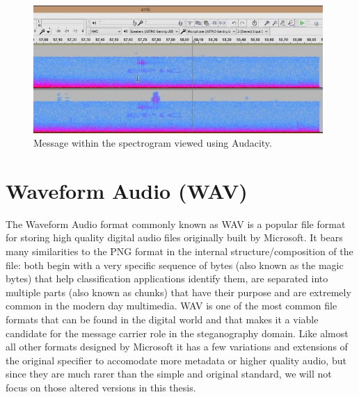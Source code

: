 \begin{figure}[H]
    \centering
    \includegraphics[width=11cm,keepaspectratio]{pics/audio_chapter/spectrogram_encoding.jpg}
    \caption{Message within the spectrogram viewed using Audacity.}
    \label{battlefield_spectrogram_easter_egg}
\end{figure}


\section{Waveform Audio (WAV)}
The Waveform Audio format commonly known as WAV is a popular file format for storing high quality digital audio files originally built by Microsoft. It bears many similarities to the PNG format in the internal structure/composition of the file: both begin with a very specific sequence of bytes (also known as the magic bytes) that help classification applications identify them, are separated into multiple parts (also known as chunks) that have their purpose and are extremely common in the modern day multimedia. WAV is one of the most common file formats that can be found in the digital world and that makes it a viable candidate for the message carrier role in the steganography domain. Like almost all other formats designed by Microsoft it has a few variations and extensions of the original specifier to accomodate more metadata or higher quality audio, but since they are much rarer than the simple and original standard, we will not focus on those altered versions in this thesis.

